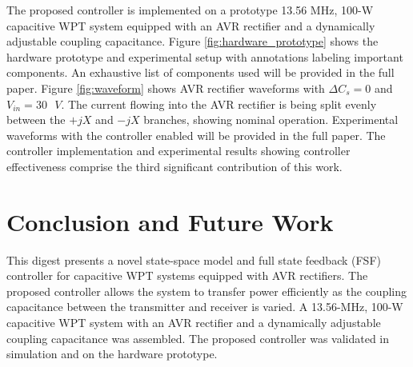 \documentclass[journal, onecolumn, final, letterpaper, 11pt]{IEEEtran}
\begin{document}
The proposed controller is implemented on a prototype 13.56 MHz, 100-W capacitive WPT system equipped with an AVR rectifier and a dynamically adjustable coupling capacitance. Figure \ref{fig:hardware_prototype} shows the hardware prototype and experimental setup with annotations labeling important components. An exhaustive list of components used will be provided in the full paper. Figure \ref{fig:waveform} shows AVR rectifier waveforms with $\Delta C_s = 0$ and $V_{in} = 30 \text{ } V$. The current flowing into the AVR rectifier is being split evenly between the $+jX$ and $-jX$ branches, showing nominal operation. Experimental waveforms with the controller enabled will be provided in the full paper. The controller implementation and experimental results showing controller effectiveness comprise the third significant contribution of this work.

\section{Conclusion and Future Work}
\label{sec:conclusion}

This digest presents a novel state-space model and full state feedback (FSF) controller for capacitive WPT systems equipped with AVR rectifiers. The proposed controller allows the system to transfer power efficiently as the coupling capacitance between the transmitter and receiver is varied. A 13.56-MHz, 100-W capacitive WPT system with an AVR rectifier and a dynamically adjustable coupling capacitance was assembled. The proposed controller was validated in simulation and on the hardware prototype.

\footnotesize
\begin{spacing}{1.0}


\end{spacing}
\end{document}
